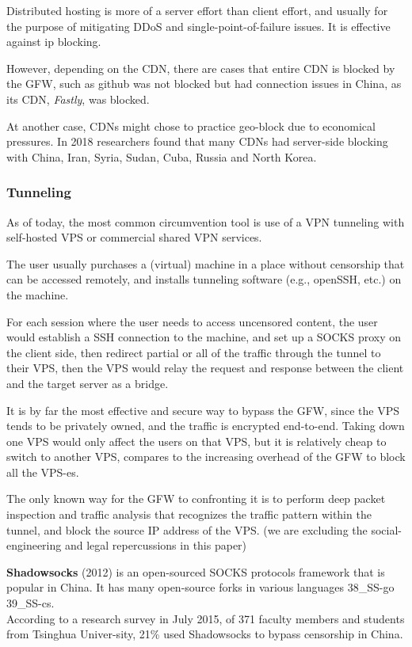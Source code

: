 \documentclass[sigconf]{acmart}
\begin{document}
Distributed hosting is more of a server effort than client effort, and
usually for the purpose of mitigating DDoS and single-point-of-failure
issues. It is effective against ip blocking.

However, depending on the CDN, there are cases that entire CDN is
blocked by the GFW, such as github was not blocked but had connection
issues in China, as its CDN, \emph{Fastly}, was blocked.
\cite{19_detect}

At another case, CDNs might chose to practice geo-block due to
economical pressures. In 2018 researchers found that many CDNs had
server-side blocking with China, Iran, Syria, Sudan, Cuba, Russia and
North Korea. \cite{51_CDN403}

\hypertarget{tunneling}{%
\subsubsection{Tunneling}\label{tunneling}}

As of today, the most common circumvention tool is use of a VPN
tunneling with self-hosted VPS or commercial shared VPN services.

The user usually purchases a (virtual) machine in a place without
censorship that can be accessed remotely, and installs tunneling
software (e.g., openSSH, etc.) on the machine.

For each session where the user needs to access uncensored content, the
user would establish a SSH connection to the machine, and set up a SOCKS
proxy on the client side, then redirect partial or all of the traffic
through the tunnel to their VPS, then the VPS would relay the request
and response between the client and the target server as a bridge.

It is by far the most effective and secure way to bypass the GFW, since
the VPS tends to be privately owned, and the traffic is encrypted
end-to-end. Taking down one VPS would only affect the users on that VPS,
but it is relatively cheap to switch to another VPS, compares to the
increasing overhead of the GFW to block all the VPS-es.

The only known way for the GFW to confronting it is to perform deep
packet inspection and traffic analysis that recognizes the traffic
pattern within the tunnel, and block the source IP address of the VPS.
(we are excluding the social-engineering and legal repercussions in this
paper)

\textbf{Shadowsocks} (2012) is an open-sourced SOCKS protocols framework
that is popular in China. It has many open-source forks in various
languages \cite{36_SS-py} \cite{37_SS-rust} 38\_SS-go 39\_SS-cs.\\
According to a research survey in July 2015, of 371 faculty members and
students from Tsinghua Univer-sity, 21\% used Shadowsocks to bypass
censorship in China. \cite{50_googleScholar}
\end{document}
